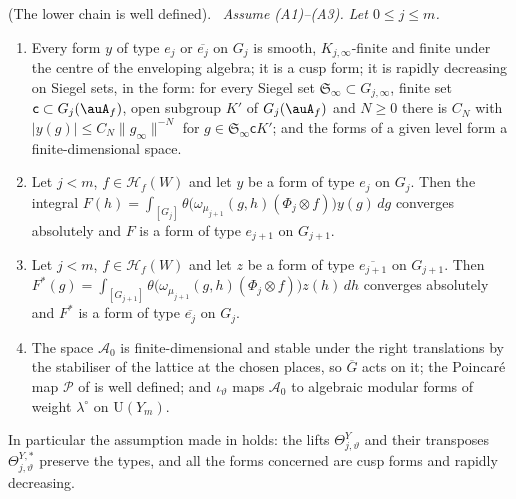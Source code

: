 \documentclass[10pt]{amsart}
\theoremstyle{definition}
\theoremstyle{remark}
\providecommand{\auAz}{\mathcal A_0}
\providecommand{\auG}{\overline G}
\providecommand{\auP}{\mathcal P}
\providecommand{\auU}{\mathrm U}
\providecommand{\psHS}{\mathcal H}
\newenvironment{quotedthm}[2]{\par\medskip\noindent\begingroup
  \textbf{#1}#2.\ \itshape\ignorespaces}{\endgroup\par\medskip}
\begin{document}
\begin{quotedthm}{\cite[Proposition~8.4]{P49}}{ (The lower chain is well defined)}
Assume {\rm(A1)--(A3)}. Let $0\le j\le m$.
\begin{enumerate}
\item[(a)] Every form $y$ of type $e_j$ or $\overline{e_j}$ on $G_j$ is smooth, $K_{j,\infty}$-finite
and finite under the centre of the enveloping algebra; it is a cusp form; it is rapidly
decreasing on Siegel sets, in the form: for every Siegel set $\mathfrak S_\infty\subset G_{j,\infty}$, finite set $\mathsf c\subset G_j(\auA_f)$, open subgroup $K'$ of $G_j(\auA_f)$ and $N\ge0$ there is $C_N$ with $|y(g)|\le C_N\|g_\infty\|^{-N}$ for $g\in\mathfrak S_\infty\mathsf cK'$; and the forms of a given level form a finite-dimensional space.
\item[(b)] Let $j<m$, $f\in\psHS_f(W)$ and let $y$ be a form of type $e_j$ on $G_j$. Then the
integral $F(h)=\int_{[G_j]}\theta\bigl(\omega_{\mu_{j+1}}(g,h)(\Phi_j\otimes f)\bigr)y(g)\,dg$ converges
absolutely and $F$ is a form of type $e_{j+1}$ on $G_{j+1}$.
\item[(c)] Let $j<m$, $f\in\psHS_f(W)$ and let $z$ be a form of type $\overline{e_{j+1}}$ on
$G_{j+1}$. Then $F^*(g)=\int_{[G_{j+1}]}\theta\bigl(\omega_{\mu_{j+1}}(g,h)(\Phi_j\otimes f)\bigr)z(h)
\,dh$ converges absolutely and $F^*$ is a form of type $\overline{e_j}$ on $G_j$.
\item[(d)] The space $\auAz$ is finite-dimensional and stable under the right translations by
the stabiliser of the lattice at the chosen places, so $\auG$ acts on it; the Poincar\'e map
$\auP$ of {\cite[\S14.3]{P46}} is well defined; and $\iota_\vartheta$ maps $\auAz$ to algebraic
modular forms of weight $\lambda^\circ$ on $\auU(Y_m)$.
\end{enumerate}
In particular the assumption made in {\cite[\S5.1.3]{P49}} holds: the lifts $\Theta^Y_{j,\vartheta}$ and
their transposes $\Theta^{Y,*}_{j,\vartheta}$ preserve the types, and all the forms concerned are
cusp forms and rapidly decreasing.
\end{quotedthm}
\end{document}
